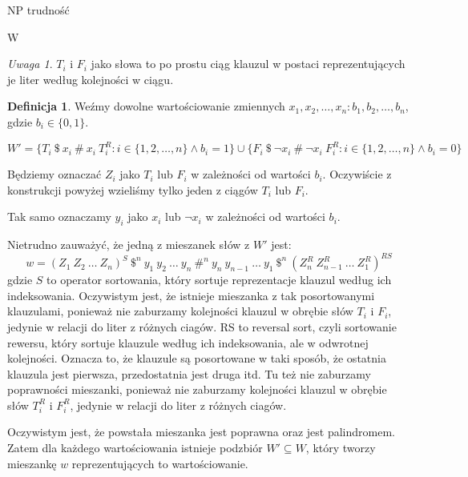 \documentclass{article}
\theoremstyle{definition}
\newtheorem{definition}{Definicja}[section]
\theoremstyle{remark}
\newtheorem{remark}{Uwaga}[section]
\begin{document}
\begin{section}{NP trudność}
\begin{subsection}{W}
     \begin{remark}
         $T_i$ i $F_i$ jako słowa to po prostu ciąg klauzul w postaci reprezentujących je liter według kolejności w ciągu.
     \end{remark}

     \begin{definition}
         \label{evaluation_proof}
         Weźmy dowolne wartościowanie zmiennych $x_1, x_2, \ldots, x_n: b_1, b_2, \ldots, b_n$, gdzie $b_i \in \{0, 1\}$.

         $ W' = \{ T_i \ \$ \ x_i \ \# \ x_i \ T_i^R: i \in \{1, 2, \ldots, n\} \land b_i = 1 \} \cup \{ F_i \ \$ \ \neg x_i \ \# \ \neg x_i \ F_i^R: i \in \{1, 2, \ldots, n\} \land b_i = 0 \}$

         Będziemy oznaczać $Z_i$ jako $T_i$ lub $F_i$ w zależności od wartości $b_i$.
         Oczywiście z konstrukcji powyżej wzieliśmy tylko jeden z ciągów $T_i$ lub
         $F_i$.

         Tak samo oznaczamy $y_i$ jako $x_i$ lub $\neg x_i$ w zależności od wartości
         $b_i$.

         Nietrudno zauważyć, że jedną z mieszanek słów z $W'$ jest:
         \[ w = (Z_1 \ Z_2 \ \ldots \ Z_n)^S \ \$^n \ y_1 \ y_2 \ \ldots \ y_n \ \#^n \ y_n \ y_{n-1} \ \ldots \ y_1 \ \$^n \ (Z_n^R \ Z_{n-1}^R \ \ldots \ Z_1^R)^{RS} \]
         gdzie $S$ to operator sortowania, który sortuje reprezentacje klauzul według
         ich indeksowania. Oczywistym jest, że istnieje mieszanka z tak posortowanymi
         klauzulami, ponieważ nie zaburzamy kolejności klauzul w obrębie słów $T_i$ i
         $F_i$, jedynie w relacji do liter z różnych ciagów. RS to reversal sort, czyli
         sortowanie rewersu, który sortuje klauzule według ich indeksowania, ale w
         odwrotnej kolejności. Oznacza to, że klauzule są posortowane w taki sposób, że
         ostatnia klauzula jest pierwsza, przedostatnia jest druga itd. Tu też nie
         zaburzamy poprawności mieszanki, ponieważ nie zaburzamy kolejności klauzul w
         obrębie słów $T_i^R$ i $F_i^R$, jedynie w relacji do liter z różnych ciagów.

         Oczywistym jest, że powstała mieszanka jest poprawna oraz jest palindromem.
         Zatem dla każdego wartościowania istnieje podzbiór $W' \subseteq W$, który
         tworzy mieszankę $w$ reprezentujących to wartościowanie.

     \end{definition}
 \end{subsection}


\end{section}
\end{document}
